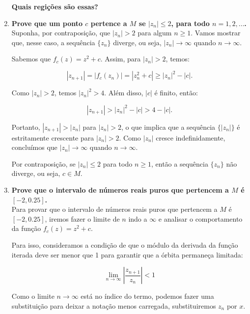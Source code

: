 \begin{enumerate}[label=(\alph*)]
        \textbf{\color{red} Quais regições são essas?}


    \item \textbf{Prove que um ponto \( c \) pertence a \( M \) se \( |z_n| \leq 2 \), para todo \( n = 1, 2, \ldots \). }\\

        Suponha, por contraposição, que \( |z_n| > 2 \) para algum \( n \geq 1 \). Vamos mostrar que, nesse caso, a sequência \( \{z_n\} \) diverge, ou seja, \( |z_n| \to \infty \) quando \( n \to \infty \).

        Sabemos que \( f_c(z) = z^2 + c \). Assim, para \( |z_n| > 2 \), temos:

        \[
        |z_{n+1}| = |f_c(z_n)| = |z_n^2 + c| \geq |z_n|^2 - |c|.
        \]

        Como \( |z_n| > 2 \), temos \( |z_n|^2 > 4 \). Além disso, \( |c| \) é finito, então:

        \[
        |z_{n+1}| > |z_n|^2 - |c| > 4 - |c|.
        \]

        Portanto, \( |z_{n+1}| > |z_n| \) para \( |z_n| > 2 \), o que implica que a sequência \( \{|z_n|\} \) é estritamente crescente para \( |z_n| > 2 \). Como \( |z_n| \) cresce indefinidamente, concluímos que \( |z_n| \to \infty \) quando \( n \to \infty \).

        Por contraposição, se \( |z_n| \leq 2 \) para todo \( n \geq 1 \), então a sequência \( \{z_n\} \) não diverge, ou seja, \( c \in M \).


    \item \textbf{Prove que o intervalo de números reais puros que pertencem a \( M \) é \( [-2, 0.25] \). }\\
    
        Para provar que o intervalo de números reais puros que pertencem a \( M \) é \( [-2, 0.25] \), iremos fazer o limite de \( n \) indo a \( \infty \) e analisar o comportamento da função \( f_c(z) = z^2 + c \).

        Para isso, consideramos a condição de que o módulo da derivada da função iterada deve ser menor que 1 para garantir que a órbita permaneça limitada:

        \[
        \lim_{n \to \infty} \left| \frac{z_{n+1}}{z_n} \right| < 1
        \]

        Como o limite \(n \to \infty\) está no índice do termo, podemos fazer uma substituição para deixar a notação menos carregada, substituiremos \(z_n\) por \(x\).


\end{enumerate}

